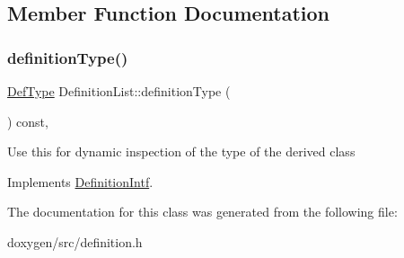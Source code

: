 \subsection{Member Function Documentation}
\mbox{\label{class_definition_list_aef3047a40f8e9519e609019db6cb13b9}} 
\subsubsection{\texorpdfstring{definitionType()}{definitionType()}}
{\footnotesize\ttfamily \mbox{\hyperlink{class_definition_intf_ada60114bc621669dd8c19edfc6421766}{Def\+Type}} Definition\+List\+::definition\+Type (\begin{DoxyParamCaption}{ }\end{DoxyParamCaption}) const\hspace{0.3cm}{\ttfamily [inline]}, {\ttfamily [virtual]}}

Use this for dynamic inspection of the type of the derived class 

Implements \mbox{\hyperlink{class_definition_intf_ac8ee00bc1af5558ae37f6896d16f5a3a}{Definition\+Intf}}.



The documentation for this class was generated from the following file\+:\begin{DoxyCompactItemize}
\item 
doxygen/src/definition.\+h\end{DoxyCompactItemize}
